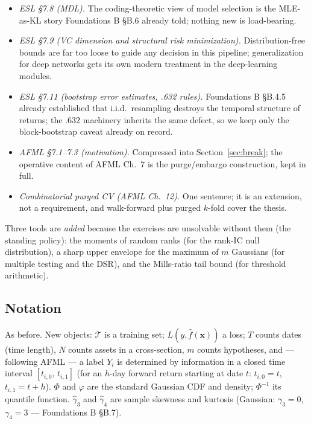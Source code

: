 \documentclass[11pt]{article}
\numberwithin{equation}{section}
\theoremstyle{plain}
\theoremstyle{definition}
\theoremstyle{remark}
\newcounter{exercise}
\newcommand{\x}{\bm{x}}
\begin{document}
\begin{itemize}[leftmargin=2em,itemsep=0.15em]
\item \emph{ESL \S7.8 (MDL).} The coding-theoretic view of model selection is the MLE-as-KL story Foundations B \S B.6 already told; nothing new is load-bearing.
\item \emph{ESL \S7.9 (VC dimension and structural risk minimization).} Distribution-free bounds are far too loose to guide any decision in this pipeline; generalization for deep networks gets its own modern treatment in the deep-learning modules.
\item \emph{ESL \S7.11 (bootstrap error estimates, .632 rules).} Foundations B \S B.4.5 already established that i.i.d.\ resampling destroys the temporal structure of returns; the .632 machinery inherits the same defect, so we keep only the block-bootstrap caveat already on record.
\item \emph{AFML \S7.1--7.3 (motivation).} Compressed into Section~\ref{sec:break}; the operative content of AFML Ch.\ 7 is the purge/embargo construction, kept in full.
\item \emph{Combinatorial purged CV (AFML Ch.\ 12).} One sentence; it is an extension, not a requirement, and walk-forward plus purged $k$-fold cover the thesis.
\end{itemize}

Three tools are \emph{added} because the exercises are unsolvable without them (the standing policy): the moments of random ranks (for the rank-IC null distribution), a sharp upper envelope for the maximum of $m$ Gaussians (for multiple testing and the DSR), and the Mills-ratio tail bound (for threshold arithmetic).

\subsection*{Notation}

As before. New objects: $\mathcal{T}$ is a training set; $L(y, \hat f(\x))$ a loss; $T$ counts dates (time length), $N$ counts assets in a cross-section, $m$ counts hypotheses, and --- following AFML --- a label $Y_i$ is determined by information in a closed time interval $[t_{i,0},\, t_{i,1}]$ (for an $h$-day forward return starting at date $t$: $t_{i,0} = t$, $t_{i,1} = t + h$). $\Phi$ and $\varphi$ are the standard Gaussian CDF and density; $\Phi^{-1}$ its quantile function. $\hat\gamma_3$ and $\hat\gamma_4$ are sample skewness and kurtosis (Gaussian: $\gamma_3 = 0$, $\gamma_4 = 3$ --- Foundations B \S B.7).
\end{document}
